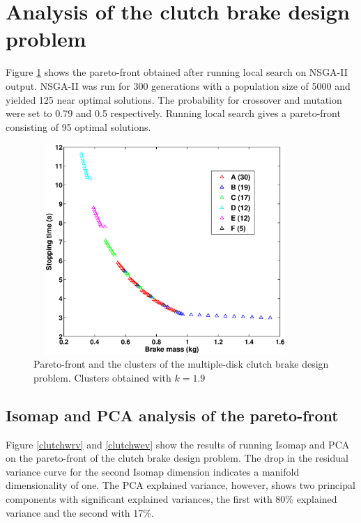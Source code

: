 \section{Analysis of the clutch brake design problem}

Figure \ref{clutch} shows the pareto-front obtained after running local
search on NSGA-II output. NSGA-II was run for 300 generations with a
population size of 5000 and yielded 125 near optimal solutions. The
probability for crossover and mutation were set to 0.79 and 0.5
respectively. Running local search gives a pareto-front consisting of 95
optimal solutions.

\begin{figure}[ht]\begin{center}
 \includegraphics[width=100mm, height=80mm]{dia/clutchParetoClusters.eps}
 \caption{Pareto-front and the clusters of the multiple-disk clutch brake
   design problem. Clusters obtained with $k = 1.9$}
 \label{clutch}
\end{center}\end{figure}


\subsection{Isomap and PCA analysis of the pareto-front} 
Figure \ref{clutchwrv} and \ref{clutchwev} show the results of running
Isomap and PCA on the pareto-front of the clutch brake design problem. The
drop in the residual variance curve for the second Isomap dimension
indicates a manifold dimensionality of one. The PCA explained variance,
however, shows two principal components with significant explained
variances, the first with 80\% explained variance and the second with 17\%.


